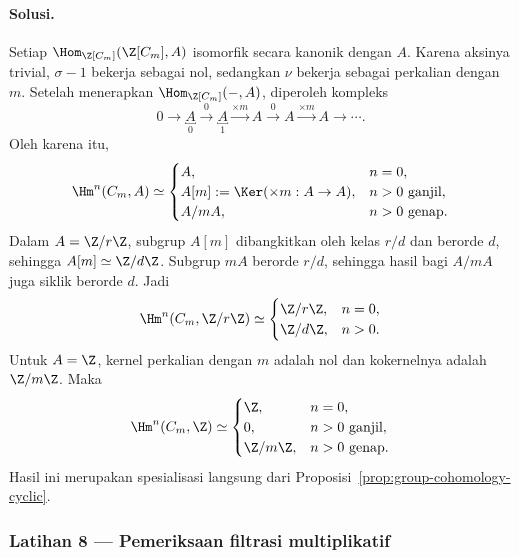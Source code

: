 \paragraph{Solusi.}
\hypertarget{o014.mastery.derived-spectral.002.sol07}{ }
Setiap $\Hom_{\Z[C_m]}(\Z[C_m],A)$ isomorfik secara kanonik dengan $A$.
Karena aksinya trivial, $\sigma-1$ bekerja sebagai nol, sedangkan $\nu$ bekerja
sebagai perkalian dengan $m$. Setelah menerapkan $\Hom_{\Z[C_m]}(-,A)$,
diperoleh kompleks
\[
	0\to\underbracket{A}_{0}\xrightarrow{0}
	\underbracket{A}_{1}\xrightarrow{\times m}A
	\xrightarrow{0}A\xrightarrow{\times m}A\to\cdots.
\]
Oleh karena itu,
\[
	\Hm^n(C_m,A)\simeq
	\begin{cases}
		A,&n=0,\\
		A[m]:=\Ker(\times m:A\to A),&n>0\text{ ganjil},\\
		A/mA,&n>0\text{ genap}.
	\end{cases}
\]
Dalam $A=\Z/r\Z$, subgrup $A[m]$ dibangkitkan oleh kelas $r/d$ dan
berorde $d$, sehingga $A[m]\simeq\Z/d\Z$. Subgrup $mA$ berorde $r/d$,
sehingga hasil bagi $A/mA$ juga siklik berorde $d$. Jadi
\[
	\Hm^n(C_m,\Z/r\Z)\simeq
	\begin{cases}
		\Z/r\Z,&n=0,\\
		\Z/d\Z,&n>0.
	\end{cases}
\]
Untuk $A=\Z$, kernel perkalian dengan $m$ adalah nol dan kokernelnya
adalah $\Z/m\Z$. Maka
\[
	\Hm^n(C_m,\Z)\simeq
	\begin{cases}
		\Z,&n=0,\\
		0,&n>0\text{ ganjil},\\
		\Z/m\Z,&n>0\text{ genap}.
	\end{cases}
\]
Hasil ini merupakan spesialisasi langsung dari
Proposisi~\ref{prop:group-cohomology-cyclic}.

\subsubsection*{Latihan 8 --- Pemeriksaan filtrasi multiplikatif}
\hypertarget{o014.mastery.derived-spectral.002.ex08}{ }
\label{mastery:derived-spectral-002-ex08}

